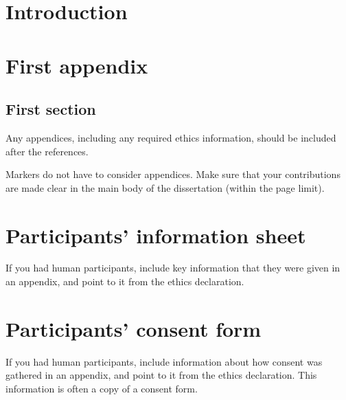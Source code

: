 \documentclass[logo,bsc,singlespacing,parskip]{infthesis}
\theoremstyle{definition}
\theoremstyle{example}
\theoremstyle{theorem}
\theoremstyle{theorem}
\theoremstyle{theorem}
\theoremstyle{theorem}
\theoremstyle{theorem}
\theoremstyle{definition}
\theoremstyle{definition}
\theoremstyle{definition}
\theoremstyle{definition}
\begin{document}
\chapter{Introduction}










% 




\appendix

\chapter{First appendix}

\section{First section}

Any appendices, including any required ethics information, should be included
after the references.

Markers do not have to consider appendices. Make sure that your contributions
are made clear in the main body of the dissertation (within the page limit).

\chapter{Participants' information sheet}

If you had human participants, include key information that they were given in
an appendix, and point to it from the ethics declaration.

\chapter{Participants' consent form}

If you had human participants, include information about how consent was
gathered in an appendix, and point to it from the ethics declaration.
This information is often a copy of a consent form.
\end{document}
